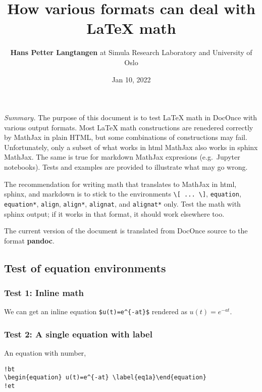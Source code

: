 \documentclass[]{article}
\title{How various formats can deal with LaTeX math}
\author{\textbf{Hans Petter Langtangen} at Simula Research Laboratory and
University of Oslo}
\date{Jan 10, 2022}
\begin{document}
\maketitle

\emph{Summary.} The purpose of this document is to test LaTeX math in
DocOnce with various output formats. Most LaTeX math constructions are
renedered correctly by MathJax in plain HTML, but some combinations of
constructions may fail. Unfortunately, only a subset of what works in
html MathJax also works in sphinx MathJax. The same is true for markdown
MathJax expresions (e.g.~Jupyter notebooks). Tests and examples are
provided to illustrate what may go wrong.

The recommendation for writing math that translates to MathJax in html,
sphinx, and markdown is to stick to the environments
\texttt{\textbackslash{}{[}\ ...\ \textbackslash{}{]}},
\texttt{equation}, \texttt{equation*}, \texttt{align}, \texttt{align*},
\texttt{alignat}, and \texttt{alignat*} only. Test the math with sphinx
output; if it works in that format, it should work elsewhere too.

The current version of the document is translated from DocOnce source to
the format \textbf{pandoc}.

\subsection{Test of equation
environments}\label{test-of-equation-environments}

\subsubsection{Test 1: Inline math}\label{test-1-inline-math}

We can get an inline equation \texttt{\$u(t)=e\^{}\{-at\}\$} rendered as
\(u(t)=e^{-at}\).

\subsubsection{Test 2: A single equation with
label}\label{test-2-a-single-equation-with-label}

An equation with number,

\begin{verbatim}
!bt
\begin{equation} u(t)=e^{-at} \label{eq1a}\end{equation}
!et
\end{verbatim}
\end{document}
